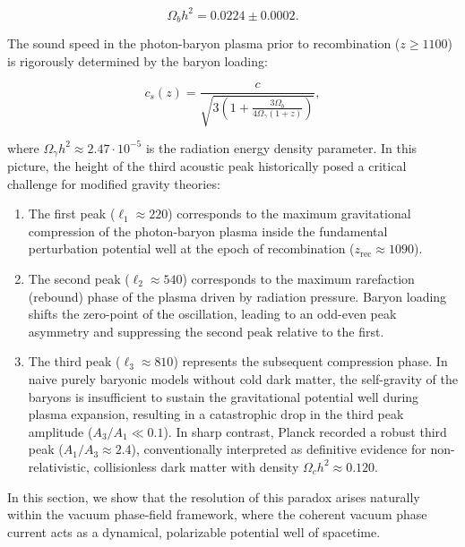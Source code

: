 \begin{equation}\label{eq:4.40a}\tag{4.40a}
\Omega_b h^2 = 0.0224 \pm 0.0002.
\end{equation}

The sound speed in the photon-baryon plasma prior to recombination ($z \ge 1100$) is rigorously determined by the baryon loading:

\begin{equation}\label{eq:4.40b}\tag{4.40b}
c_s(z) = \frac{c}{\sqrt{3 \left( 1 + \frac{3 \Omega_b}{4 \Omega_\gamma (1+z)} \right)}},
\end{equation}

where $\Omega_\gamma h^2 \approx 2.47 \cdot 10^{-5}$ is the radiation energy density parameter. In this picture, the height of the third acoustic peak historically posed a critical challenge for modified gravity theories:

\begin{enumerate}
\item The first peak ($\ell_1 \approx 220$) corresponds to the maximum gravitational compression of the photon-baryon plasma inside the fundamental perturbation potential well at the epoch of recombination ($z_{\text{rec}} \approx 1090$).

\item The second peak ($\ell_2 \approx 540$) corresponds to the maximum rarefaction (rebound) phase of the plasma driven by radiation pressure. Baryon loading shifts the zero-point of the oscillation, leading to an odd-even peak asymmetry and suppressing the second peak relative to the first.

\item The third peak ($\ell_3 \approx 810$) represents the subsequent compression phase. In naive purely baryonic models without cold dark matter, the self-gravity of the baryons is insufficient to sustain the gravitational potential well during plasma expansion, resulting in a catastrophic drop in the third peak amplitude ($A_3 / A_1 \ll 0.1$). In sharp contrast, Planck recorded a robust third peak ($A_1 / A_3 \approx 2.4$), conventionally interpreted as definitive evidence for non-relativistic, collisionless dark matter with density $\Omega_c h^2 \approx 0.120$.
\end{enumerate}

In this section, we show that the resolution of this paradox arises naturally within the vacuum phase-field framework, where the coherent vacuum phase current acts as a dynamical, polarizable potential well of spacetime.



